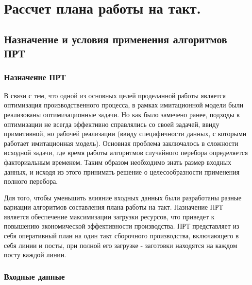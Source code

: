 \chapter{Рассчет плана работы на такт.}

\section{Назначение и условия применения алгоритмов ПРТ}
\subsection{Назначение ПРТ}
В связи с тем, что одной из основных целей проделанной работы является оптимизация производственного процесса, в рамках имитационной модели были реализованы оптимизационные задачи. Но как было замечено ранее, подходы к оптимизации не всегда эффективно справлялись со своей задачей, ввиду примитивной, но рабочей реализации (ввиду специфичности данных, с которыми работает имитационная модель). Основная проблема заключалось в сложности исходной задачи, где время работы алгоритмов случайного перебора определяется факториальным временем. Таким образом необходимо знать размер входных данных, и исходя из этого принимать решение о целесообразности применения полного перебора.

Для того, чтобы уменьшить влияние входных данных были разработаны разные вариации алгоритмов составления плана работы на такт. Назначение ПРТ является обеспечение максимизации загрузки ресурсов, что приведет к повышению экономической эффективности производства. ПРТ представляет из себя оперативный план на один такт сборочного производства, включающего в себя линии и посты, при полной его загрузке - заготовки находятся на каждом посту каждой линии.

\subsection{Входные данные}

